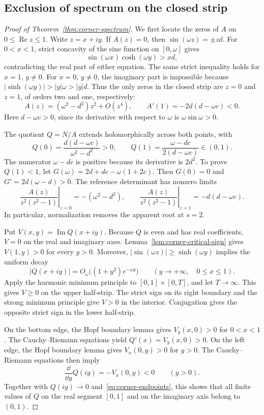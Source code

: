 \subsection{Exclusion of spectrum on the closed strip}

\begin{proof}[Proof of Theorem~\ref{thm:corner-spectrum}]
We first locate the zeros of $A$ on $0\leq\operatorname{Re}z\leq1$. Write $z=x+iy$. If $A(z)=0$, then $\sin(\omega z)=\pm zd$. For $0<x<1$, strict concavity of the sine function on $[0,\omega]$ gives
\[
\sin(\omega x)\cosh(\omega y)>xd,
\]
contradicting the real part of either equation. The same strict inequality holds for $x=1$, $y\neq0$. For $x=0$, $y\neq0$, the imaginary part is impossible because $|\sinh(\omega y)|>|y|\omega>|y|d$. Thus the only zeros in the closed strip are $z=0$ and $z=1$, of orders two and one, respectively:
\[
A(z)=(\omega^2-d^2)z^2+O(z^4),\qquad
A'(1)=-2d(d-\omega c)<0.
\]
Here $d-\omega c>0$, since its derivative with respect to $\omega$ is $\omega\sin\omega>0$.

The quotient $Q=N/A$ extends holomorphically across both points, with
\begin{equation}\label{eq:corner-endpoints}
Q(0)=\frac{d(d-\omega c)}{\omega^2-d^2}>0,
\qquad Q(1)=\frac{\omega-dc}{2(d-\omega c)}\in(0,1).
\end{equation}
The numerator $\omega-dc$ is positive because its derivative is $2d^2$. To prove $Q(1)<1$, let $G(\omega)=2d+dc-\omega(1+2c)$. Then $G(0)=0$ and $G'=2d(\omega-d)>0$. The reference determinant has nonzero limits
\[
\left.\frac{A(z)}{z^2(z^2-1)}\right|_{z=0}=-(\omega^2-d^2),
\qquad
\left.\frac{A(z)}{z^2(z^2-1)}\right|_{z=1}=-d(d-\omega c).
\]
In particular, normalization removes the apparent root at $s=2$.

Put $V(x,y)=\operatorname{Im}Q(x+iy)$. Because $Q$ is even and has real coefficients, $V=0$ on the real and imaginary axes. Lemma~\ref{lem:corner-critical-sign} gives $V(1,y)>0$ for every $y>0$. Moreover, $|\sin(\omega z)|\geq\sinh(\omega y)$ implies the uniform decay
\[
|Q(x+iy)|=O_\omega\big((1+y^2)e^{-\omega y}\big)
\qquad(y\to+\infty,\quad0\leq x\leq1).
\]
Apply the harmonic minimum principle to $[0,1]\times[0,T]$, and let $T\to\infty$. This gives $V\geq0$ on the upper half-strip. The strict sign on its right boundary and the strong minimum principle give $V>0$ in the interior. Conjugation gives the opposite strict sign in the lower half-strip.

On the bottom edge, the Hopf boundary lemma gives $V_y(x,0)>0$ for $0<x<1$. The Cauchy--Riemann equations yield $Q'(x)=V_y(x,0)>0$. On the left edge, the Hopf boundary lemma gives $V_x(0,y)>0$ for $y>0$. The Cauchy--Riemann equations then imply
\[
\frac{\dd}{\dd y}Q(iy)=-V_x(0,y)<0
\qquad(y>0).
\]
Together with $Q(iy)\to0$ and~\eqref{eq:corner-endpoints}, this shows that all finite values of $Q$ on the real segment $[0,1]$ and on the imaginary axis belong to $(0,1)$.


\end{proof}
